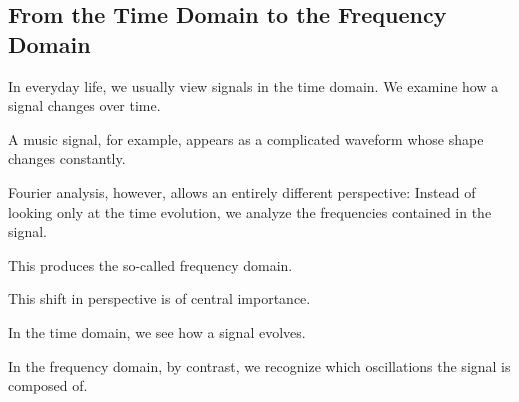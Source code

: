 \subsection{From the Time Domain to the Frequency Domain}

In everyday life, we usually view signals in the time domain.
We examine
how a signal changes over time.

A music signal, for example,
appears as a complicated waveform
whose shape changes constantly.

Fourier analysis, however, allows an entirely different perspective:
Instead of looking only at the time evolution,
we analyze the frequencies contained in the signal.

This produces the so-called frequency domain.

\medskip

This shift in perspective is of central importance.

In the time domain, we see
how a signal evolves.

In the frequency domain, by contrast, we recognize
which oscillations the signal is composed of.

